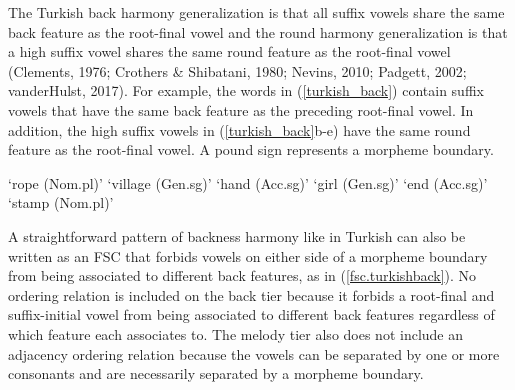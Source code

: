 \documentclass[floatsintext,man]{apa6}
\theoremstyle{definition}
\theoremstyle{definition}
\theoremstyle{definition}
\theoremstyle{remark}
\begin{document}
The Turkish back harmony generalization is that all suffix vowels share
the same back feature as the root-final vowel and the round harmony
generalization is that a high suffix vowel shares the same round feature
as the root-final vowel (Clements, 1976; Crothers \& Shibatani, 1980;
Nevins, 2010; Padgett, 2002; vanderHulst, 2017). For example, the words
in (\ref{turkish_back}) contain suffix vowels that have the same back
feature as the preceding root-final vowel. In addition, the high suffix
vowels in (\ref{turkish_back}b-e) have the same round feature as the
root-final vowel. A pound sign represents a morpheme boundary.

\begin{exe}
\label{turkish_back}
\begin{xlist}
  \ex {} `rope (Nom.pl)'
  \ex {} `village (Gen.sg)'
  \ex {}   `hand (Acc.sg)'
  \ex {} `girl (Gen.sg)'
  \ex {}  `end (Acc.sg)'
  \ex {} `stamp (Nom.pl)'
\end{xlist}
\end{exe}

A straightforward pattern of backness harmony like in Turkish can also
be written as an FSC that forbids vowels on either side of a morpheme
boundary from being associated to different back features, as in
(\ref{fsc.turkishback}). No ordering relation is included on the back
tier because it forbids a root-final and suffix-initial vowel from being
associated to different back features regardless of which feature each
associates to. The melody tier also does not include an adjacency
ordering relation because the vowels can be separated by one or more
consonants and are necessarily separated by a morpheme boundary.

\begin{exe}
\ex \label{fsc.turkishback}
\end{exe}
\end{document}
